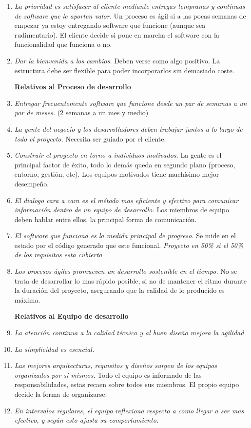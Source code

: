 \documentclass[titlepage,a4paper]{article}
\begin{document}
\begin{enumerate}

    \item \textit{La prioridad es satisfacer al cliente mediante entregas tempranas y continuas de software que le aporten valor.} Un proceso es ágil si a las pocas semanas de empezar ya estoy entregando software que funcione (aunque sea rudimentario). El cliente decide si pone en marcha el software con la funcionalidad que funciona o no.
    \item \textit{Dar la bienvenida a los cambios.} Deben verse como algo positivo. La estructura debe ser flexible para poder incorporarlos sin demasiado coste.
    
    \textbf{Relativos al Proceso de desarrollo}
    
    \item \textit{Entregar frecuentemente software que funcione desde un par de semanas a un par de meses.} (2 semanas a un mes y medio)
    \item \textit{La gente del negocio y los desarrolladores deben trabajar juntos a lo largo de todo el proyecto.} Necesita ser guiado por el cliente.
    \item \textit{Construir el proyecto en torno a individuos motivados.} La gente es el principal factor de éxito, todo lo demás queda en segundo plano (proceso, entorno, gestión, etc). Los equipos motivados tiene muchísimo mejor desempeño.
    \item \textit{El dialogo cara a cara es el método mas eficiente y efectivo para comunicar información dentro de un equipo de desarrollo.} Los miembros de equipo deben hablar entre ellos, la principal forma de comunicación.
    \item \textit{El software que funciona es la medida principal de progreso.} Se mide en el estado por el código generado que este funcional. \textit{Proyecto en 50\% si el 50\% de los requisitos esta cubierto}
    \item \textit{Los procesos ágiles promueven un desarrollo sostenible en el tiempo.} No se trata de desarrollar lo mas rápido posible, si no de mantener el ritmo durante la duración del proyecto, asegurando que la calidad de lo producido es máxima.
    
    \textbf{Relativos al Equipo de desarrollo}
   
    
    \item \textit{La atención continua a la calidad técnica y al buen diseño mejora la agilidad.}
    
    \item \textit{La simplicidad es esencial.}
    \item \textit{Las mejores arquitecturas, requisitos y diseños surgen de los equipos organizados por si mismos.} Todo el equipo es informado de las responsabilidades, estas recaen sobre todos sus miembros. El propio equipo decide la forma de organizarse.
    \item \textit{En intervalos regulares, el equipo reflexiona respecto a como llegar a ser mas efectivo, y según esto ajusta su comportamiento.}
\end{enumerate}
\end{document}
